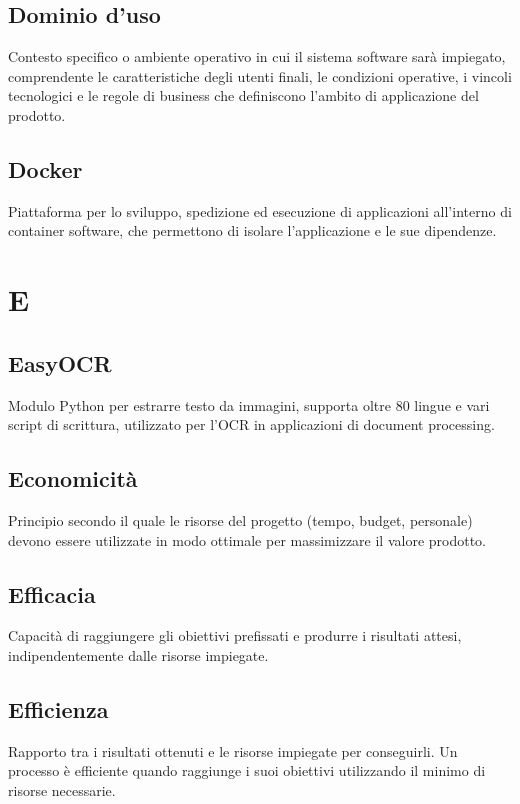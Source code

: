 \documentclass[a4paper,11pt]{article}
\begin{document}
\subsection{Dominio d'uso}
Contesto specifico o ambiente operativo in cui il sistema software sarà impiegato, comprendente le caratteristiche degli utenti finali, le condizioni operative, i vincoli tecnologici e le regole di business che definiscono l'ambito di applicazione del prodotto.

\subsection{Docker}
Piattaforma per lo sviluppo, spedizione ed esecuzione di applicazioni all'interno di container software, che permettono di isolare l'applicazione e le sue dipendenze.

\newpage
\section{E}

\subsection{EasyOCR}
Modulo Python per estrarre testo da immagini, supporta oltre 80 lingue e vari script di scrittura, utilizzato per l'OCR in applicazioni di document processing.

\subsection{Economicità}
Principio secondo il quale le risorse del progetto (tempo, budget, personale) devono essere utilizzate in modo ottimale per massimizzare il valore prodotto.

\subsection{Efficacia}
Capacità di raggiungere gli obiettivi prefissati e produrre i risultati attesi, indipendentemente dalle risorse impiegate.

\subsection{Efficienza}
Rapporto tra i risultati ottenuti e le risorse impiegate per conseguirli. Un processo è efficiente quando raggiunge i suoi obiettivi utilizzando il minimo di risorse necessarie.
\end{document}
